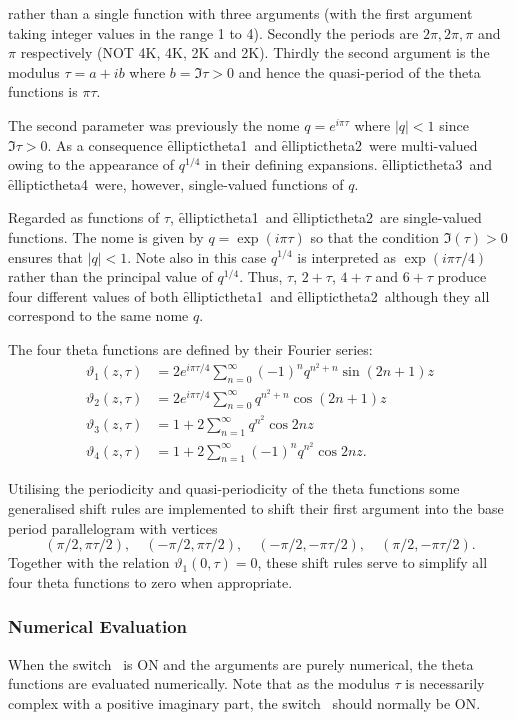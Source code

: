 rather than a single function with three arguments (with the first argument
taking integer values in the range 1 to 4).
Secondly the periods are $2\pi, 2\pi, \pi$ and $\pi$ respectively
(NOT 4K, 4K, 2K and 2K).
Thirdly the second argument is the modulus $\tau = a+i b$ where $b=\Im\tau>0$
and hence the quasi-period of the theta functions is $\pi\tau$.

The second parameter was previously the nome $q=e^{i\pi\tau}$ where $|q|<1$
since $\Im\tau>0$.
As a consequence \f{elliptictheta1}\ and \f{elliptictheta2}\ were multi-valued
owing to the appearance of $q^{1/4}$ in their defining expansions.
\f{elliptictheta3}\ and \f{elliptictheta4}\ were, however, single-valued
functions of $q$.

Regarded as functions of $\tau$,
\f{elliptictheta1}\ and \f{elliptictheta2}\ are single-valued functions. The
nome is given by $q = \exp(i\pi\tau)$  so that the condition $\Im(\tau)>0$
ensures that $|q| < 1$. Note also  in this case $q^{1/4}$ is interpreted as
$\exp(i\pi\tau/4)$ rather than the principal value of $q^{1/4}$.
Thus, $\tau$, $2+\tau$, $4+\tau$ and $6+\tau$ produce four different values of
both \f{elliptictheta1}\ and \f{elliptictheta2}\ although they all correspond to
the same nome $q$.

The four theta functions are defined by their Fourier series:
\begin{align*}
  \vartheta_1(z,\tau) & = 2 e^{i\pi\tau/4}\sum_{n=0}^\infty (-1)^nq^{n^2+n} \sin(2n+1)z\\
\vartheta_2(z,\tau) & = 2 e^{i\pi\tau/4}\sum_{n=0}^\infty q^{n^2+n} \cos(2n+1)z\\
\vartheta_3(z,\tau) & = 1 +2\sum_{n=1}^\infty q^{n^2} \cos 2n z\\
\vartheta_4(z,\tau) & = 1 +2\sum_{n=1}^\infty (-1)^n q^{n^2} \cos 2n z.
\end{align*}

Utilising the periodicity and quasi-periodicity of the theta functions
some generalised shift rules are implemented to shift their first argument
into the base period parallelogram with vertices
\[(\pi/2, \pi\tau/2),\quad (-\pi/2, \pi\tau/2),\quad (-\pi/2, -\pi\tau/2),
\quad (\pi/2, -\pi\tau/2).\]
Together with the relation $\vartheta_1(0,\tau)=0$,  these shift rules serve to
simplify all four theta functions to zero when appropriate.

\subsubsection{Numerical Evaluation}
When the switch \ is ON and the arguments are
purely numerical, the theta functions are evaluated numerically.
Note that as the modulus $\tau$ is necessarily complex with a positive
imaginary part, the switch \ should normally be ON.

